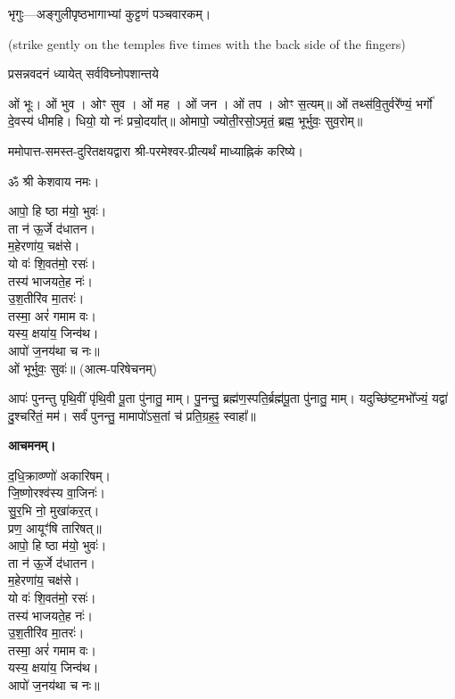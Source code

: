 
भृगुः—अङ्गुलीपृष्ठभागाभ्यां कुट्टणं पञ्चवारकम्।

{\scriptsize (strike gently on the temples five times with the back side of the fingers)}

{प्रसन्नवदनं ध्यायेत् सर्वविघ्नोपशान्तये}


ओं भूः। ओं भुव। ओꣳ सुव। ओं मह। ओं जन। ओं तप। ओꣳ स॒त्यम्॥
ओं तथ्स॑वि॒तुर्वरे᳚ण्यं॒ भर्गो॑ दे॒वस्य॑ धीमहि। धियो॒ यो नः॑ प्रचो॒दया᳚त्॥
ओमापो॒ ज्योती॒रसो॒ऽमृतं॒ ब्रह्म॒ भूर्भुवः॒ सुव॒रोम्॥


ममोपात्त-समस्त-दुरितक्षयद्वारा श्री-परमेश्वर-प्रीत्यर्थं माध्याह्निकं करिष्ये।


ॐ श्री केशवाय नमः।

आपो॒ हि ष्ठा म॑यो॒ भुवः॑।\\
ता न॑ ऊ॒र्जे द॑धातन।\\
म॒हेरणा॑य॒ चक्ष॑से।\\
यो वः॑ शि॒वत॑मो॒ रसः॑।\\
तस्य॑ भाजयते॒ह नः॑।\\
उ॒श॒तीरि॑व मा॒तरः॑।\\
तस्मा॒ अरं॑ गमाम वः।\\
यस्य॒ क्षया॑य॒ जिन्व॑थ।\\
आपो॑ ज॒नय॑था च नः॥\\

ओं भूर्भुवः॒ सुवः॑॥ (आत्म-परिषेचनम्)


आपः॑ पुनन्तु पृथि॒वीं पृ॑थि॒वी पू॒ता पु॑नातु॒ माम्। पु॒नन्तु॒ ब्रह्म॑ण॒स्पति॒र्ब्रह्म॑पू॒ता पु॑नातु॒ माम्। यदुच्छि॑ष्ट॒मभो᳚ज्यं॒ यद्वा॑ दु॒श्चरि॑तं॒ मम॑। सर्वं॑ पुनन्तु॒ मामापो॑ऽस॒तां च॑ प्रति॒ग्रह॒ꣴ॒ स्वाहा᳚॥


\textbf{आचमनम्।}

द॒धि॒क्राव्ण्णो॑ अकारिषम्।\\
 जि॒ष्णोरश्व॑स्य वा॒जिनः॑।\\
सु॒र॒भि नो॒ मुखा॑कर॒त्।\\
प्रण॒ आयूꣳ॑षि तारिषत्॥\\



आपो॒ हि ष्ठा म॑यो॒ भुवः॑।\\
ता न॑ ऊ॒र्जे द॑धातन।\\
म॒हेरणा॑य॒ चक्ष॑से।\\
यो वः॑ शि॒वत॑मो॒ रसः॑।\\
तस्य॑ भाजयते॒ह नः॑।\\
उ॒श॒तीरि॑व मा॒तरः॑।\\
तस्मा॒ अरं॑ गमाम वः।\\
यस्य॒ क्षया॑य॒ जिन्व॑थ।\\
आपो॑ ज॒नय॑था च नः॥\\

